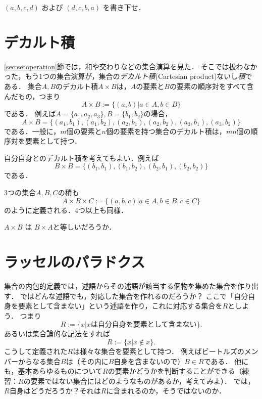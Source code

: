 \documentclass[11pt,a4paper]{jsarticle}
\begin{document}
\begin{exercise}
$(a,b,c,d)$ および $(d,c,b,a)$ を書き下せ．
\end{exercise} 

 
\section{デカルト積}
\ref{sec:setoperation}節では，和や交わりなどの集合演算を見た．
そこでは扱わなかった，もう1つの集合演算が，集合の\emph{デカルト積}(Cartesian product)ないし\emph{積}である．
集合$A, B$のデカルト積$A \times B$は，$A$の要素と$B$の要素の順序対をすべて含んだもの，つまり
\[
 A \times B := \{ (a, b) | a \in A, b \in B\}
\]
である．
例えば$A = \{a_1, a_2, a_3\}, B = \{b_1, b_2\}$の場合，
\[
A \times B = \{(a_1, b_1), (a_1, b_2), (a_2, b_1), (a_2, b_2), (a_3, b_1), (a_3, b_2)\}
\]
である．一般に，$m$個の要素と$n$個の要素を持つ集合のデカルト積は，$mn$個の順序対を要素として持つ．

自分自身とのデカルト積を考えてもよい．例えば
\[
B \times B = \{(b_1, b_1), (b_1, b_2), (b_2, b_1), (b_2, b_2)\}
\]
である．

3つの集合$A, B, C$の積も
\[
 A \times B \times C := \{ (a, b, c) | a \in A, b \in B, c \in C \}
\]
のように定義される．4つ以上も同様．


\begin{exercise}
$A \times B$ は $B \times A$と等しいだろうか．
\end{exercise} 

%


\section{ラッセルのパラドクス}
集合の内包的定義では，述語からその述語が該当する個物を集めた集合を作り出す．
ではどんな述語でも，対応した集合を作れるのだろうか？
ここで「自分自身を要素として含まない」という述語を作り，これに対応する集合を$R$としよう．
つまり
\[
 R := \{x | x \text{は自分自身を要素として含まない}\}.
\]
あるいは集合論的な記法をすれば
\[
 R := \{x | x \not \in x\}.
\]
こうして定義された$R$は様々な集合を要素として持つ．
例えばビートルズのメンバーからなる集合$B$は（その内に$B$自身を含まないので）$B \in R$である．
他にも，基本あらゆるものについて$R$の要素かどうかを判断することができる（練習：$R$の要素ではない集合にはどのようなものがあるか，考えてみよ）．
では，$R$自身はどうだろうか？それは$R$に含まれるのか，そうではないのか．
\end{document}
